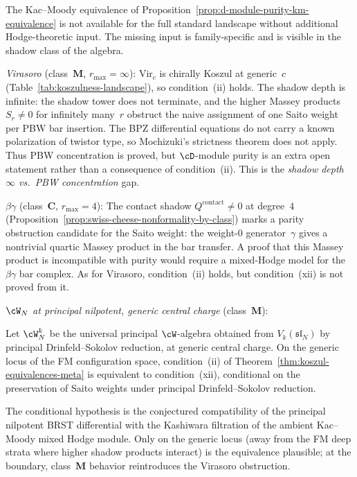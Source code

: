 \begin{remark}
\label{rem:d-module-purity-family-dependence}
The Kac--Moody equivalence of
Proposition~\ref{prop:d-module-purity-km-equivalence} is not available
for the full standard landscape without additional Hodge-theoretic
input. The missing input is family-specific and is visible in the
shadow class of the algebra.

\emph{Virasoro} \textup{(}class~$\mathbf{M}$,
$r_{\max} = \infty$\textup{):}
$\mathrm{Vir}_c$ is chirally Koszul at generic~$c$
(Table~\ref{tab:koszulness-landscape}), so condition~(ii)
holds. The shadow depth is infinite: the shadow tower
does not terminate, and the higher Massey products
$S_r \neq 0$ for infinitely many~$r$ obstruct the naive assignment of
one Saito weight per PBW bar insertion. The BPZ differential equations
do not carry a known polarization of twistor type, so Mochizuki's
strictness theorem does not apply. Thus PBW concentration is proved,
but $\cD$-module purity is an extra open statement rather than a
consequence of condition~(ii).
This is the \emph{shadow depth~$\infty$ vs.\ PBW
concentration} gap.

\emph{$\beta\gamma$} \textup{(}class~$\mathbf{C}$,
$r_{\max} = 4$\textup{):}
The contact shadow $Q^{\mathrm{contact}} \neq 0$ at degree~$4$
(Proposition~\ref{prop:swiss-cheese-nonformality-by-class})
marks a parity obstruction candidate for the Saito weight: the
weight-$0$ generator~$\gamma$ gives a nontrivial quartic Massey product
in the bar transfer. A proof that this Massey product is incompatible
with purity would require a mixed-Hodge model for the $\beta\gamma$
bar complex. As for Virasoro, condition~(ii) holds, but
condition~(xii) is not proved from it.

\emph{$\cW_N$ at principal nilpotent, generic central
charge} \textup{(}class~$\mathbf{M}$\textup{):}
\begin{conjecture}
\label{conj:d-module-purity-wn-principal}
Let $\cW_N^k$ be the universal principal $\cW$-algebra
obtained from $V_k(\mathfrak{sl}_N)$ by principal
Drinfeld--Sokolov reduction, at generic central charge.
On the generic locus of the FM configuration space,
condition~(ii) of
Theorem~\ref{thm:koszul-equivalences-meta} is equivalent
to condition~(xii), conditional on the preservation of
Saito weights under principal Drinfeld--Sokolov reduction.
\end{conjecture}
The conditional hypothesis is the conjectured compatibility
of the principal nilpotent BRST differential with the
Kashiwara filtration of the ambient Kac--Moody mixed Hodge
module. Only on the generic locus (away from the FM deep
strata where higher shadow products interact) is the
equivalence plausible; at the boundary, class~$\mathbf{M}$
behavior reintroduces the Virasoro obstruction.


\end{remark}
